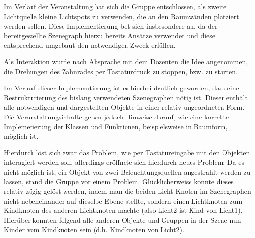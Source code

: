 \documentclass{article}
\begin{document}
Im Verlauf der Veranstaltung hat sich die Gruppe entschlossen, als zweite Lichtquelle kleine Lichtspots zu verwenden, die an den Raumwänden platziert werden sollen. 
Diese Implementierung bot sich insbesondere an, da der bereitgestellte Szenegraph hierzu bereits Ansätze verwendet und diese entsprechend umgebaut den notwendigen Zweck erfüllen. 

Als Interaktion wurde nach Absprache mit dem Dozenten die Idee angenommen, die Drehungen des Zahnrades per Tastaturdruck zu stoppen, bzw. zu starten. 

Im Verlauf dieser Implememtierung ist es hierbei deutlich geworden, dass eine Restrukturierung des bislang verwendeten Szenegraphen nötig ist. 
Dieser enthält alle notwendigen und dargestellten Objekte in einer relativ ungeordneten Form.
Die Veranstaltungsinhalte geben jedoch Hinweise darauf, wie eine korrekte Implemetierung der Klassen und Funktionen, beispielsweise in Baumform, möglich ist. 

Hierdurch löst sich zwar das Problem, wie per Tastatureingabe mit den Objekten interagiert werden soll, allerdings eröffnete sich hierdurch neues Problem: 
Da es nicht möglich ist, ein Objekt von zwei Beleuchtungsquellen angestrahlt werden zu lassen, stand die Gruppe vor einem Problem. 
Glücklicherweise konnte dieses relativ zügig gelöst werden, indem man die beiden Licht-Knoten im Szenegraphen nicht nebeneinander auf dieselbe Ebene stellte, sondern einen Lichtknoten zum Kindknoten des anderen Lichtknoten machte (also Licht2 ist Kind von Licht1). 
Hierüber konnten folgend alle anderen Objekte und Gruppen in der Szene nun Kinder vom Kindknoten sein (d.h. Kindknoten von Licht2). 
\end{document}
